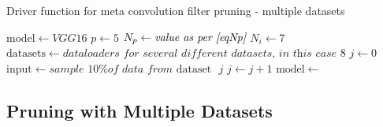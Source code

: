 \documentclass{article}
\begin{document}
\begin{algorithm}[t]
	\caption{Driver function for meta convolution filter pruning - multiple datasets} \label{FilterPruneDriverMeta}
	\begin{algorithmic}[1]	
		\State $\mathrm{model} \gets \textit{VGG16}$
		\State $p \gets 5$
		\State $N_p \gets \textit{value as per \eqref{eqNp}}$
		\State $N_i \gets 7$
		\State $\mathrm{datasets} \gets \textit{dataloaders for several different datasets, in this case $8$}$
		\State $j \gets 0$
				\State $\mathrm{input} \gets \textit{sample 10\% of data from $\mathrm{dataset}$ }j$
				\State $j \gets j + 1$
			\EndIf
			\State $\mathrm{model} \gets $ 
		\EndWhile
	\end{algorithmic}
\end{algorithm}

\subsection{Pruning with Multiple Datasets}
\end{document}
